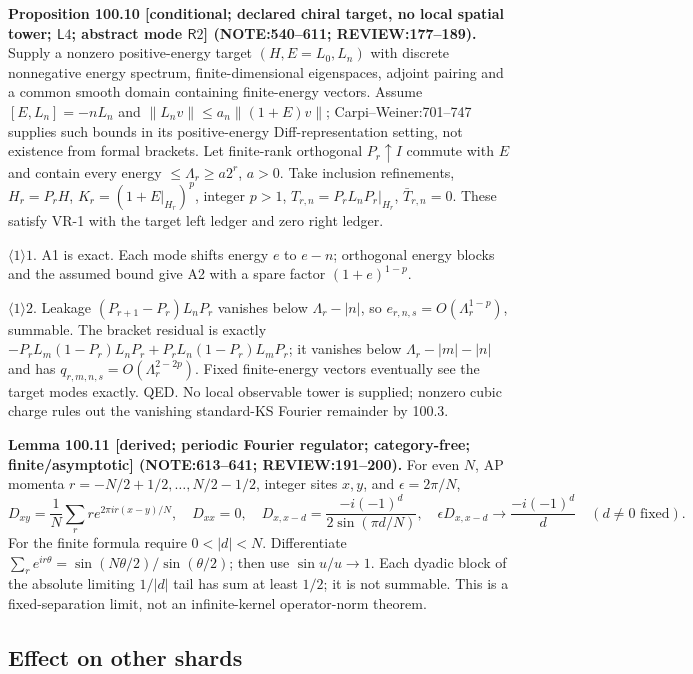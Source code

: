 \textbf{Proposition 100.10 [conditional; declared chiral target, no local spatial tower; \(\mathsf L4\); abstract mode \(\mathsf R2\)] (NOTE:540--611; REVIEW:177--189).}
Supply a nonzero positive-energy target \((H,E=L_0,L_n)\) with discrete nonnegative energy spectrum,
finite-dimensional eigenspaces, adjoint pairing and a common smooth domain containing finite-energy vectors.
Assume \([E,L_n]=-nL_n\) and \(\|L_nv\|\le a_n\|(1+E)v\|\); Carpi--Weiner:701--747 supplies such bounds
in its positive-energy Diff-representation setting, not existence from formal brackets.
Let finite-rank orthogonal \(P_r\uparrow I\) commute with \(E\) and contain every energy \(\le\Lambda_r\ge a2^r\), \(a>0\).
Take inclusion refinements, \(H_r=P_rH\), \(K_r=(1+E|_{H_r})^p\), integer \(p>1\),
\(T_{r,n}=P_rL_nP_r|_{H_r}\), \(\bar T_{r,n}=0\). These satisfy VR-1 with the target left ledger and zero right ledger.
\par\(\langle1\rangle1\). A1 is exact. Each mode shifts energy \(e\) to \(e-n\); orthogonal energy blocks and the
assumed bound give A2 with a spare factor \((1+e)^{1-p}\).
\par\(\langle1\rangle2\). Leakage \((P_{r+1}-P_r)L_nP_r\) vanishes below \(\Lambda_r-|n|\), so
\(e_{r,n,s}=O(\Lambda_r^{1-p})\), summable. The bracket residual is exactly
\(-P_rL_m(1-P_r)L_nP_r+P_rL_n(1-P_r)L_mP_r\); it vanishes below \(\Lambda_r-|m|-|n|\) and has
\(q_{r,m,n,s}=O(\Lambda_r^{2-2p})\). Fixed finite-energy vectors eventually see the target modes exactly. QED.
No local observable tower is supplied; nonzero cubic charge rules out the vanishing standard-KS Fourier remainder by 100.3.

\textbf{Lemma 100.11 [derived; periodic Fourier regulator; category-free; finite/asymptotic] (NOTE:613--641; REVIEW:191--200).}
For even \(N\), AP momenta \(r=-N/2+1/2,\ldots,N/2-1/2\), integer sites \(x,y\), and \(\epsilon=2\pi/N\),
\[
 D_{xy}=\frac1N\sum_r r e^{2\pi ir(x-y)/N},\quad D_{xx}=0,\quad
 D_{x,x-d}=\frac{-i(-1)^d}{2\sin(\pi d/N)},\quad
 \epsilon D_{x,x-d}\longrightarrow\frac{-i(-1)^d}{d}\quad(d\ne0\text{ fixed}).
\]
For the finite formula require \(0<|d|<N\). Differentiate \(\sum_re^{ir\theta}=\sin(N\theta/2)/\sin(\theta/2)\); then use \(\sin u/u\to1\).
Each dyadic block of the absolute limiting \(1/|d|\) tail has sum at least \(1/2\); it is not summable. This is a fixed-separation limit, not an infinite-kernel operator-norm theorem.

\subsection{Effect on other shards}

